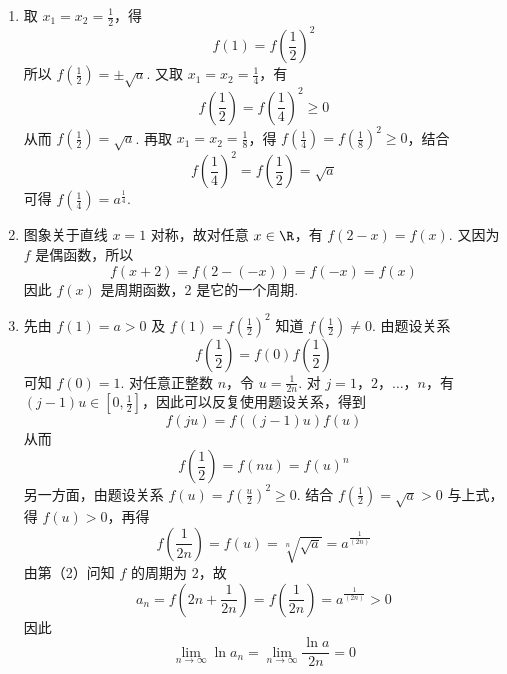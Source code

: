 \begin{solution}
\begin{enumerate}
\item 取 \(x_1=x_2=\frac{1}{2}\)，得
\[
f(1)=f\left(\frac{1}{2}\right)^2
\]
所以 \(f\left(\frac{1}{2}\right)=\pm\sqrt{a}\). 又取 \(x_1=x_2=\frac{1}{4}\)，有
\[
f\left(\frac{1}{2}\right)=f\left(\frac{1}{4}\right)^2\geqslant0
\]
从而 \(f\left(\frac{1}{2}\right)=\sqrt{a}\). 再取 \(x_1=x_2=\frac{1}{8}\)，得 \(f\left(\frac{1}{4}\right)=f\left(\frac{1}{8}\right)^2\geqslant0\)，结合
\[
f\left(\frac{1}{4}\right)^2=f\left(\frac{1}{2}\right)=\sqrt{a}
\]
可得 \(f\left(\frac{1}{4}\right)=a^{\frac{1}{4}}\).
\item 图象关于直线 \(x=1\) 对称，故对任意 \(x\in\R\)，有 \(f(2-x)=f(x)\). 又因为 \(f\) 是偶函数，所以
\[
f(x+2)=f(2-(-x))=f(-x)=f(x)
\]
因此 \(f(x)\) 是周期函数，\(2\) 是它的一个周期.
\item 先由 \(f(1)=a>0\) 及 \(f(1)=f\left(\frac{1}{2}\right)^2\) 知道 \(f\left(\frac{1}{2}\right)\neq0\). 由题设关系
\[
f\left(\frac{1}{2}\right)=f(0)f\left(\frac{1}{2}\right)
\]
可知 \(f(0)=1\). 对任意正整数 \(n\)，令 \(u=\frac{1}{2n}\). 对 \(j=1\)，\(2\)，\(\ldots\)，\(n\)，有 \((j-1)u\in\left[0,\frac{1}{2}\right]\)，因此可以反复使用题设关系，得到
\[
f(ju)=f((j-1)u)f(u)
\]
从而
\[
f\left(\frac{1}{2}\right)=f(nu)=f(u)^n
\]
另一方面，由题设关系 \(f(u)=f\left(\frac{u}{2}\right)^2\geqslant0\). 结合 \(f\left(\frac{1}{2}\right)=\sqrt{a}>0\) 与上式，得 \(f(u)>0\)，再得
\[
f\left(\frac{1}{2n}\right)=f(u)=\sqrt[n]{\sqrt{a}}=a^{\frac{1}{(2n)}}
\]
由第（2）问知 \(f\) 的周期为 \(2\)，故
\[
a_n=f\left(2n+\frac{1}{2n}\right)=f\left(\frac{1}{2n}\right)=a^{\frac{1}{(2n)}}>0
\]
因此
\[
\lim_{n\to\infty}\ln a_n=\lim_{n\to\infty}\frac{\ln a}{2n}=0
\]
\end{enumerate}
\end{solution}
